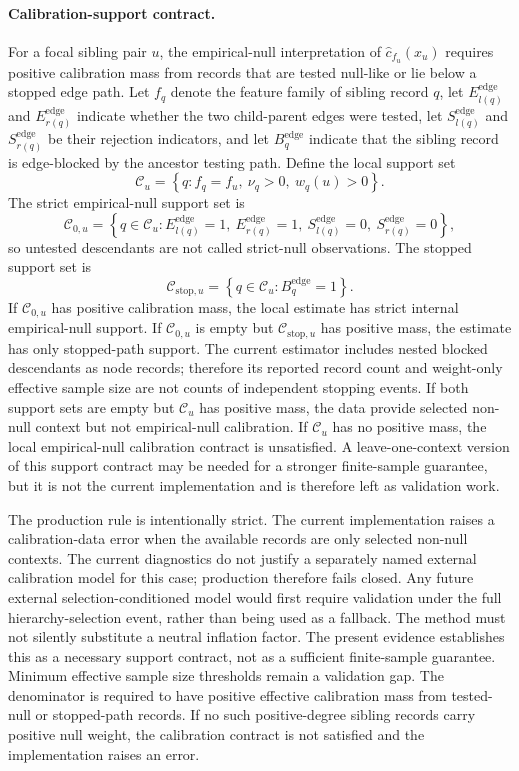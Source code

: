 \paragraph{Calibration-support contract.}
For a focal sibling pair $u$, the empirical-null interpretation of
\(\hat c_{f_u}(x_u)\) requires positive calibration mass from records that are
tested null-like or lie below a stopped edge path.
Let $f_q$ denote the feature family of sibling record $q$, let
$E_{l(q)}^{\mathrm{edge}}$ and $E_{r(q)}^{\mathrm{edge}}$ indicate whether the
two child-parent edges were tested, let $S_{l(q)}^{\mathrm{edge}}$ and
$S_{r(q)}^{\mathrm{edge}}$ be their rejection indicators, and let
$B_q^{\mathrm{edge}}$ indicate that the sibling record is edge-blocked by the
ancestor testing path. Define the local support set
\[
\mathcal C_u
=
\left\{
q:
f_q=f_u,\ \nu_q>0,\ w_q(u)>0
\right\}.
\]
The strict empirical-null support set is
\[
\mathcal C_{0,u}
=
\left\{
q\in\mathcal C_u:
E_{l(q)}^{\mathrm{edge}}=1,\
E_{r(q)}^{\mathrm{edge}}=1,\
S_{l(q)}^{\mathrm{edge}}=0,\
S_{r(q)}^{\mathrm{edge}}=0
\right\},
\]
so untested descendants are not called strict-null observations. The stopped
support set is
\[
\mathcal C_{\mathrm{stop},u}
=
\left\{
q\in\mathcal C_u:
B_q^{\mathrm{edge}}=1
\right\}.
\]
If $\mathcal C_{0,u}$ has positive calibration mass, the local estimate has
strict internal empirical-null support. If $\mathcal C_{0,u}$ is empty but
$\mathcal C_{\mathrm{stop},u}$ has positive mass, the estimate has only
stopped-path support. The current estimator includes nested blocked descendants
as node records; therefore its reported record count and weight-only effective
sample size are not counts of independent stopping events. If both support sets
are empty but $\mathcal C_u$ has positive
mass, the data provide selected non-null context but not empirical-null
calibration. If $\mathcal C_u$ has no positive mass, the local empirical-null
calibration contract is unsatisfied. A leave-one-context version of this
support contract may be needed for a stronger finite-sample guarantee, but it
is not the current implementation and is therefore left as validation work.

The production rule is intentionally strict. The current implementation raises
a calibration-data error when the available records are only selected non-null
contexts. The current diagnostics do not justify a separately named external
calibration model for this case; production therefore fails closed. Any future
external selection-conditioned model would first require validation under the
full hierarchy-selection event, rather than being used as a fallback. The method
must not silently substitute a neutral inflation factor.
The present evidence establishes this as a necessary support contract, not as a
sufficient finite-sample guarantee. Minimum effective sample size thresholds
remain a validation gap.
The denominator is required to have positive effective calibration mass from
tested-null or stopped-path records. If no such positive-degree sibling
records carry positive null weight, the calibration contract is not satisfied
and the implementation raises an error.

